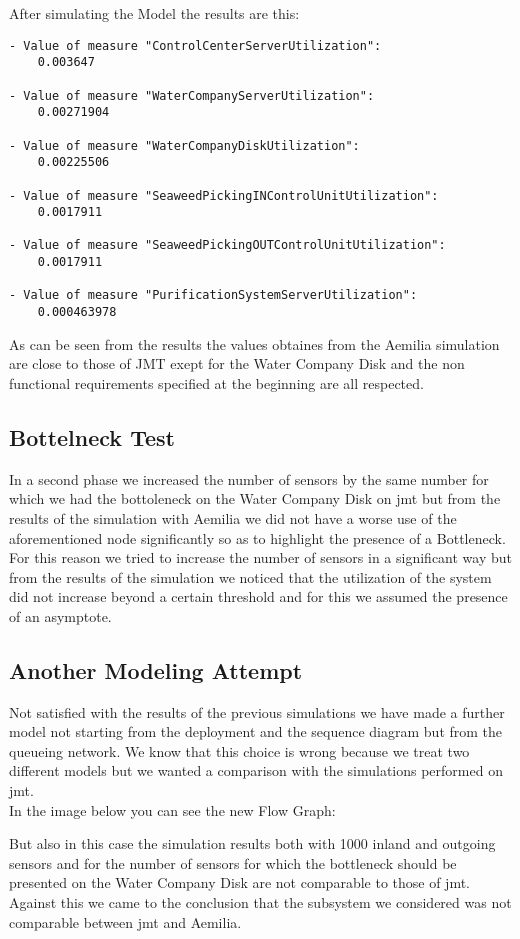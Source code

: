 After simulating the Model the results are this:

\lstset {language = C}
\bigskip
\begin{lstlisting}
- Value of measure "ControlCenterServerUtilization":
	0.003647

- Value of measure "WaterCompanyServerUtilization":
	0.00271904

- Value of measure "WaterCompanyDiskUtilization":
	0.00225506

- Value of measure "SeaweedPickingINControlUnitUtilization":
	0.0017911

- Value of measure "SeaweedPickingOUTControlUnitUtilization":
	0.0017911

- Value of measure "PurificationSystemServerUtilization":
	0.000463978
\end{lstlisting}

As can be seen from the results the values obtaines from the Aemilia simulation are close to those of JMT  exept for the Water Company Disk and the non functional requirements specified at the beginning are all respected.\\

\subsection{Bottelneck Test}

In a second phase we increased the number of sensors by the same number for which we had the bottoleneck on the Water Company Disk on jmt but from the results of the simulation with Aemilia we did not have a worse use of the aforementioned node significantly so as to highlight the presence of a Bottleneck.\\
For this reason we tried to increase the number of sensors in a significant way but from the results of the simulation we noticed that the utilization of the system did not increase beyond a certain threshold and for this we assumed the presence of an asymptote.

\subsection{Another Modeling Attempt}


Not satisfied with the results of the previous simulations we have made a further model not starting from the deployment and the sequence diagram but from the queueing network. We know that this choice is wrong because we treat two different models but we wanted a comparison with the simulations performed on jmt.\\
In the image below you can see the new Flow Graph:


But also in this case the simulation results both with 1000 inland and outgoing sensors and for the number of sensors for which the bottleneck should be presented on the Water Company Disk are not comparable to those of jmt.\\


Against this we came to the conclusion that the subsystem we considered was not comparable between jmt and Aemilia.